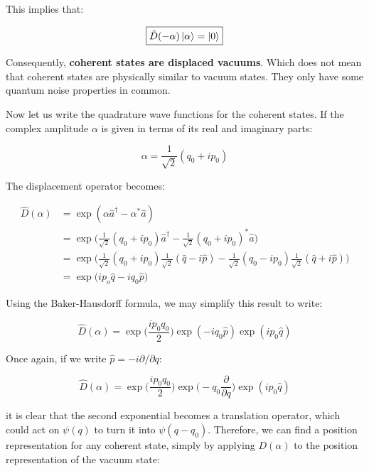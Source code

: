 \documentclass[12pt,a4paper]{report}
\begin{document}
This implies that:

\begin{equation}
    \boxed{\hat D(-\alpha)\ket{\alpha}=\ket{0}}
\end{equation}

Consequently, \textbf{coherent states are displaced vacuums}. Which does not mean that coherent states are physically similar to vacuum states. They only have some quantum noise properties in common.

Now let us write the quadrature wave functions for the coherent states. If the complex amplitude $\alpha$ is given in terms of its real and imaginary parts:

\begin{equation}
    \alpha=\frac{1}{\sqrt{2}}(q_0+ip_0)
\end{equation}

The displacement operator becomes:

\begin{align*}
    \hat D(\alpha)  & =\exp(\alpha \hat a^{\dag}-\alpha^*\hat a)\\
                    & =\exp \Big( \frac{1}{\sqrt{2}}(q_0+ip_0) \hat a^{\dag}-\frac{1}{\sqrt{2}}(q_0+ip_0)^* \hat a\Big)\\
                    & =\exp\Big(\frac{1}{\sqrt{2}}(q_0+ip_0) \frac{1}{\sqrt{2}}(\hat q-i\hat p)-\frac{1}{\sqrt{2}}(q_0-ip_0) \frac{1}{\sqrt{2}}(\hat q+i\hat p)\Big)\\
                    &=\exp\Big(ip_o\hat q- iq_0\hat p\Big)
\end{align*}

Using the Baker-Hausdorff formula, we may simplify this result to write:

\begin{equation}
    \hat D(\alpha)=\exp\Big(\frac{ip_0q_0}{2}\Big)\exp(-iq_0\hat p)\exp(ip_0\hat q)
\end{equation}

Once again, if we write $\hat p = -i\partial/\partial q$:

\begin{equation}
    \hat D(\alpha)=\exp\Big(\frac{ip_0q_0}{2}\Big)\exp\Big(-q_0\frac{\partial}{\partial q}\Big)\exp(ip_0\hat q)
\end{equation}

it is clear that the second exponential becomes a translation operator, which could act on $\psi(q)$ to turn it into $\psi(q-q_0)$. Therefore, we can find a position representation for any coherent state, simply by applying $D(\alpha)$ to the position representation of the vacuum state:
\end{document}
